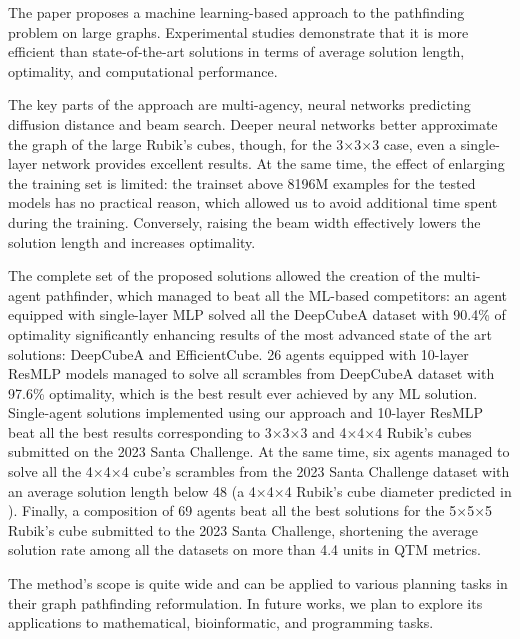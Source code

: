 The paper proposes a machine learning-based approach to the pathfinding problem on large graphs. Experimental studies demonstrate that it is more efficient than state-of-the-art solutions in terms of average solution length, optimality, and computational performance.

The key parts of the approach are multi-agency, neural networks predicting diffusion distance and beam search. Deeper neural networks better approximate the graph of the large Rubik's cubes, though, for the 3$\times$3$\times$3 case, even a single-layer network provides excellent results. At the same time, the effect of enlarging the training set is limited: the trainset above 8196M examples for the tested models has no practical reason, which allowed us to avoid additional time spent during the training.
Conversely, raising the beam width effectively lowers the solution length and increases optimality.

The complete set of the proposed solutions allowed the creation of the multi-agent pathfinder, which managed to beat all the ML-based competitors: an agent equipped with single-layer MLP solved all the DeepCubeA dataset with 90.4\% of optimality significantly enhancing results of the most advanced state of the art solutions: DeepCubeA and EfficientCube. 26 agents equipped with 10-layer ResMLP models managed to solve all scrambles from DeepCubeA dataset with 97.6\% optimality, which is the best result ever achieved by any ML solution. Single-agent solutions implemented using our approach and 10-layer ResMLP beat all the best results corresponding to 3$\times$3$\times$3 and 4$\times$4$\times$4 Rubik's cubes submitted on the 2023 Santa Challenge. At the same time, six agents managed to solve all the 4$\times$4$\times$4 cube's scrambles from the 2023 Santa Challenge dataset with an average solution length below 48 (a 4$\times$4$\times$4 Rubik's cube diameter predicted in \cite{hirata2024probabilistic}). Finally, a composition of 69 agents beat all the best solutions for the 5$\times$5$\times$5 Rubik's cube submitted to the 2023 Santa Challenge, shortening the average solution rate among all the datasets on more than 4.4 units in QTM metrics.

The method's scope is quite wide and can be applied to various planning tasks in their graph pathfinding reformulation. In future works, we plan to explore its applications to mathematical, bioinformatic, and programming tasks. 
